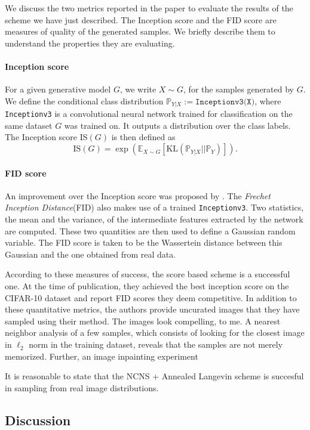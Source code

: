 \documentclass[11pt,twoside]{article}
\theoremstyle{definition}
\newcommand{\Prb}{\mathbb{P}}
\newcommand{\E}{\mathbb{E}}
\newcommand{\KL}{\text{KL}}
\begin{document}
We discuss the two metrics reported in the paper to evaluate the results of the scheme we have just described. The Inception score and the FID score are measures of quality of the generated samples. We briefly describe them to understand the properties they are evaluating.

\paragraph{Inception score} For a given generative model $G$, we write $X \sim G$, for the samples generated by $G$. We define the conditional class distribution $\Prb_{Y|X} := \texttt{Inceptionv3(X)}$, where \texttt{Inceptionv3} is a convolutional neural network trained for classification on the same dataset $G$ was trained on. It outputs a distribution over the class labels. The Inception score IS$(G)$ is then defined as 
\[
\text{IS}(G) = \exp \left(\E_{X \sim G} [\KL(\Prb_{Y|X} || \Prb_Y)] \right).
\]

\paragraph{FID score}  An improvement over the Inception score was proposed by \cite{heusel_gans_2017}. The \textit{Frechet Inception Distance}(FID) also makes use of a trained \texttt{Inceptionv3}. Two statistics, the mean and the variance, of the intermediate features extracted by the network are computed. These two quantities are then used to define a Gaussian random variable. The FID score is taken to be the Wassertein distance between this Gaussian and the one obtained from real data.

According to these measures of success, the score based scheme is a successful one. At the time of publication, they achieved the best inception score on the CIFAR-10 dataset and report FID scores they deem competitive. In addition to these quantitative metrics, the authors provide uncurated images that they have sampled using their method. The images look compelling, to me. A nearest neighbor analysis of a few samples, which consists of looking for the closest image in $\ell_2$ norm in the training dataset, reveals that the samples are not merely memorized. Further, an image inpainting experiment 

It is reasonable to state that the NCNS + Annealed Langevin scheme is succesful in sampling from real image distributions.

\subsection{Discussion}
\end{document}
